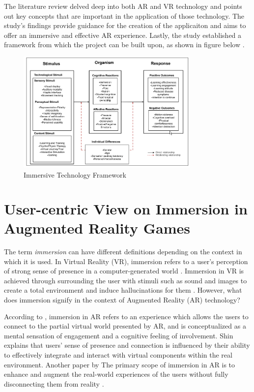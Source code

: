 The literature review delved deep into both AR and VR technology and points out key concepts that are important in the application of those technology. The study's findings provide guidance for the creation of the applicaiton and aims to offer an immersive and effective AR experience. Lastly, the study established a framework from which the project can be built upon, as shown in figure below \cite{suh2018}.

\begin{figure}[h]
    \centering
    \includegraphics[width=0.8\textwidth]{figures/ImmersiveFramework.png}
    \caption{Immersive Technology Framework}
\end{figure}

\section{User-centric View on Immersion in Augmented Reality Games}

The term \textit{immersion} can have different definitions depending on the context in which it is used. In Virtual Reality (VR), immersion refers to a user's perception of strong sense of presence in a computer-generated world \cite{immersionAR}. Immersion in VR is achieved through surrounding the user with stimuli such as sound and images to create a total environment and induce hallucinations for them \cite{immersionAR}. However, what does immersion signify in the context of Augmented Reality (AR) technology? 

According to \cite{immersionAR}, immersion in AR refers to an experience which allows the users to connect to the partial virtual world presented by AR, and is conceptualized as a mental sensation of engagement and a cognitive feeling of involvement. Shin explains that users' sense of presence and connection is influenced by their ability to effectively integrate and interact with virtual components within the real environment. Another paper by \cite{KIM201379} The primary scope of immersion in AR is to enhance and augment the real-world experiences of the users without fully disconnecting them from reality \cite{midles2024}.

